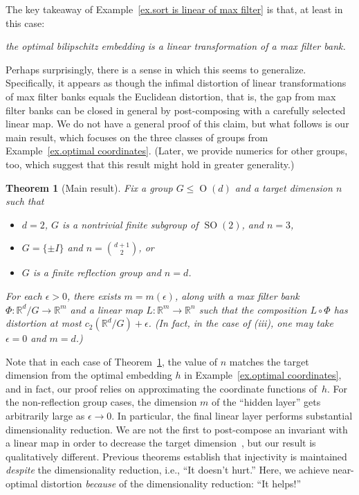 \documentclass{article}
\theoremstyle{plain}
\newtheorem{theorem}{Theorem}
\theoremstyle{definition}
\begin{document}
The key takeaway of Example~\ref{ex.sort is linear of max filter} is that, at least in this case:
\begin{center}
\textit{the optimal bilipschitz embedding is a linear transformation of a max filter bank.}
\end{center}
Perhaps surprisingly, there is a sense in which this seems to generalize.
Specifically, it appears as though the infimal distortion of linear transformations of max filter banks equals the Euclidean distortion, that is, the gap from max filter banks can be closed in general by post-composing with a carefully selected linear map.
We do not have a general proof of this claim, but what follows is our main result, which focuses on the three classes of groups from Example~\ref{ex.optimal coordinates}.
(Later, we provide numerics for other groups, too, which suggest that this result might hold in greater generality.)

\begin{theorem}[Main result]
\label{thm.main result}
Fix a group $G\leq\operatorname{O}(d)$ and a target dimension $n$ such that
\begin{itemize}
\item[(a)] 
$d=2$, $G$ is a nontrivial finite subgroup of $\operatorname{SO}(2)$, and $n=3$,
\item[(b)]
$G=\{\pm I\}$ and $n=\binom{d+1}{2}$, or
\item[(c)]
$G$ is a finite reflection group and $n=d$.
\end{itemize}
For each $\epsilon > 0$, there exists $m=m(\epsilon)$, along with a max filter bank $\Phi\colon \mathbb{R}^d/G\to\mathbb{R}^m$ and a linear map $L\colon\mathbb{R}^m\to\mathbb{R}^n$ such that the composition $L\circ\Phi$ has distortion at most $c_2(\mathbb{R}^d/G) + \epsilon$.
(In fact, in the case of (iii), one may take $\epsilon=0$ and $m=d$.)
\end{theorem}

Note that in each case of Theorem~\ref{thm.main result}, the value of $n$ matches the target dimension from the optimal embedding $h$ in Example~\ref{ex.optimal coordinates}, and in fact, our proof relies on approximating the coordinate functions of~$h$.
For the non-reflection group cases, the dimension $m$ of the ``hidden layer'' gets arbitrarily large as $\epsilon\to0$.
In particular, the final linear layer performs substantial dimensionality reduction.
We are not the first to post-compose an invariant with a linear map in order to decrease the target dimension~\cite{BalanT:23,BalanTW:24,BalanHS:25}, but our result is qualitatively different. 
Previous theorems establish that injectivity is maintained \textit{despite} the dimensionality reduction, i.e., ``It doesn't hurt.'' 
Here, we achieve near-optimal distortion \textit{because} of the dimensionality reduction: ``It helps!''
\end{document}

